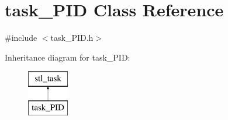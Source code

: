 \hypertarget{classtask__PID}{\section{task\-\_\-\-P\-I\-D Class Reference}
\label{classtask__PID}
}


{\ttfamily \#include $<$task\-\_\-\-P\-I\-D.\-h$>$}

Inheritance diagram for task\-\_\-\-P\-I\-D\-:\begin{figure}[H]
\begin{center}
\leavevmode
\includegraphics[height=2.000000cm]{classtask__PID}
\end{center}
\end{figure}

